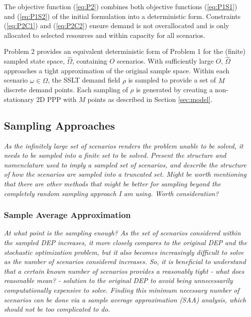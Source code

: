 \documentclass[12pt,dvips]{report}
\begin{document}
The objective function (\ref{eq:P2}) combines both objective functions (\ref{eq:P1S1}) and (\ref{eq:P1S2}) of the initial formulation into a deterministic form.  Constraints (\ref{eq:P2C1}) and (\ref{eq:P2C2})	ensure demand is not overallocated and is only allocated to selected resources and within capacity for all scenarios.

Problem 2 provides an equivalent deterministic form of Problem 1 for the (finite) sampled state space, $\hat{\Omega}$, containing $O$ scenarios.  With sufficiently large $O$, $\hat{\Omega}$ approaches a tight approximation of the original sample space.  Within each scenario $\omega \in \hat{\Omega}$, the SSLT demand field $\rho$ is sampled to provide a set of $M$ discrete demand points.  Each sampling of $\rho$ is generated by creating a non-stationary 2D PPP with $M$ points as described in Section \ref{sec:model}.

\subsection{Sampling Approaches} \label{subsec:dep_sampling}

\textit{As the infinitely large set of scenarios renders the problem unable to be solved, it needs to be sampled into a finite set to be solved.  Present the structure and nomenclature used to imply a sampled set of scenarios, and describe the structure of how the scenarios are sampled into a truncated set.  Might be worth mentioning that there are other methods that might be better for sampling beyond the completely random sampling approach I am using.  Worth consideration?}

\subsubsection{Sample Average Approximation} \label{subsubsec:dep_sampling_saa}

\textit{At what point is the sampling enough?  As the set of scenarios considered within the sampled DEP increases, it more closely compares to the original DEP and the stochastic optimization problem, but it also becomes increasingly difficult to solve as the number of scenarios considered increases.  So, it is beneficial to understand that a certain known number of scenarios provides a reasonably tight - what does reasonable mean? - solution to the original DEP to avoid being unnecessarily computationally expensive to solve.  Finding this minimum necessary number of scenarios can be done via a sample average approximation (SAA) analysis, which should not be too complicated to do.}
\end{document}
